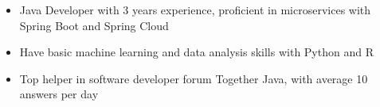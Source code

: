 \begin{itemize}
    \item Java Developer with 3 years experience, proficient in microservices with Spring Boot and Spring Cloud
    \item Have basic machine learning and data analysis skills with Python and R 
    \item Top helper in software developer forum Together Java, with average 10 answers per day
\end{itemize}